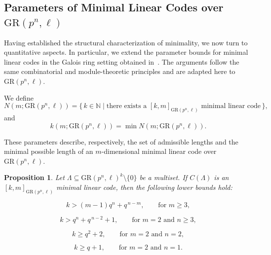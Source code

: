 \documentclass[10pt]{article}
\newtheorem{prop}[lem]{Proposition}
\theoremstyle{definition}
\begin{document}
\subsection{Parameters of Minimal Linear Codes over $\mathrm{GR}(p^{n},\ell)$}

Having established the structural characterization of minimality, we now turn to quantitative aspects.
In particular, we extend the parameter bounds for minimal linear codes in the Galois ring setting obtained in~\cite{ChatterjeeMesnager}.
The arguments follow the same combinatorial and module-theoretic principles and are adapted here to $\mathrm{GR}(p^{n},\ell)$.

We define
\[
N(m;\mathrm{GR}(p^{n},\ell))
=
\{\, k \in \mathbb{N} \mid
\text{there exists a } [k,m]_{\mathrm{GR}(p^{n},\ell)}
\text{ minimal linear code} \,\},
\]
and
\[
k(m;\mathrm{GR}(p^{n},\ell))
=
\min N(m;\mathrm{GR}(p^{n},\ell)).
\]

These parameters describe, respectively, the set of admissible lengths and the minimal possible length of an $m$-dimensional minimal linear code over $\mathrm{GR}(p^{n},\ell)$.

\begin{prop}
Let \( \Lambda \subseteq \mathrm{GR}(p^{n},\ell)^{k} \setminus \{0\} \) be a multiset.
If \( C(\Lambda) \) is an \( [k,m]_{\mathrm{GR}(p^{n},\ell)} \) minimal linear code, then the following lower bounds hold:

\[
k > (m-1)q^{n} + q^{\,n-m},
\qquad \text{for } m \ge 3,
\]

\[
k > q^{n} + q^{\,n-2} + 1,
\qquad \text{for } m = 2 \text{ and } n \ge 3,
\]

\[
k \ge q^{2} + 2,
\qquad \text{for } m = 2 \text{ and } n = 2,
\]

\[
k \ge q + 1,
\qquad \text{for } m = 2 \text{ and } n = 1.
\]
\end{prop}
\end{document}
